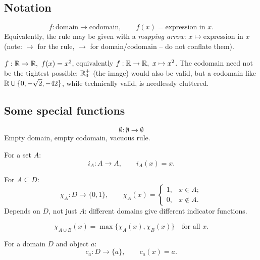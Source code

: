 \documentclass[11pt]{article}
\begin{document}
\subsection{Notation}
\label{sec:2-3}
\begin{definition}
\[
f : \text{domain} \to \text{codomain}, \qquad f(x) = \text{expression in } x.
\]
Equivalently, the rule may be given with a \emph{mapping arrow}: $x \mapsto \text{expression in } x$ (note: $\mapsto$ for the rule, $\to$ for domain/codomain -- do not conflate them).
\end{definition}

\begin{example}
$f : \mathbb{R} \to \mathbb{R},\ f(x) = x^2$, equivalently $f: \mathbb{R} \to \mathbb{R},\ x \mapsto x^2$. The codomain need not be the tightest possible: $\mathbb{R}_0^+$ (the image) would also be valid, but a codomain like $\mathbb{R} \cup \{0,-\sqrt2,-42\}$, while technically valid, is needlessly cluttered.
\end{example}

\subsection{Some special functions}
\label{sec:2-4}
\begin{definition}
\[
\emptyset : \emptyset \to \emptyset
\]
Empty domain, empty codomain, vacuous rule.
\end{definition}

\begin{definition}
For a set $A$:
\[
i_A : A \to A, \qquad i_A(x) = x.
\]
\end{definition}

\begin{definition}
For $A \subseteq D$:
\[
\chi_A : D \to \{0,1\}, \qquad
\chi_A(x) =
\begin{cases}
1, & x \in A; \\
0, & x \notin A.
\end{cases}
\]
Depends on $D$, not just $A$: different domains give different indicator functions.
\end{definition}

\begin{example}
\[
\chi_{A \cup B}(x) = \max\{\chi_A(x), \chi_B(x)\} \quad \text{for all } x.
\]
\end{example}

\begin{definition}
For a domain $D$ and object $a$:
\[
c_a : D \to \{a\}, \qquad c_a(x) = a.
\]
\end{definition}
\end{document}

